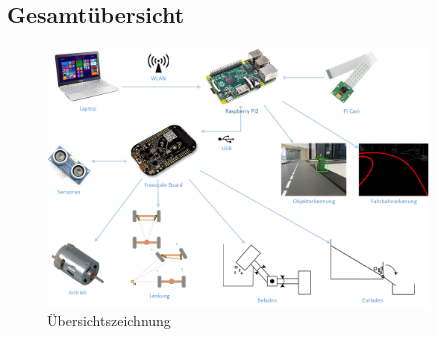 \subsection{Gesamtübersicht}
\begin{figure}[H]%
\centering
\includegraphics[width=0.9\textwidth]{03_Loesungskonzept/pictures/uebersichtszeichnung.png}
\caption{Übersichtszeichnung}
\label{fig:Übersichtszeichnung}
\end{figure}

